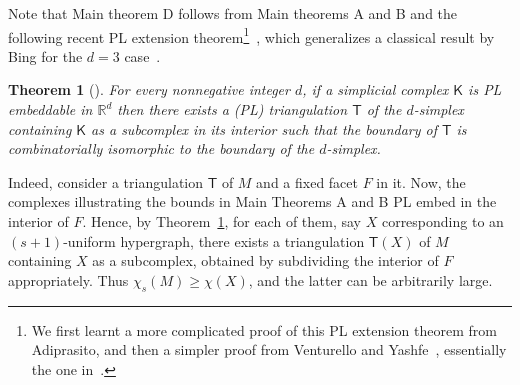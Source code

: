 \documentclass{article}
\newcommand{\RR}{\mathbb{R}}
\newcommand{\sK}{\mathsf{K}}
\newtheorem{thm}{Theorem}[section]
\theoremstyle{definition}
\begin{document}
Note that Main theorem D follows from Main theorems A and B and the following recent PL extension theorem\footnote{We first learnt a more complicated proof of this PL extension theorem from Adiprasito, and then a simpler proof from Venturello and Yashfe~\cite{PL-extension-karim-geva}, essentially the one in~\cite{adiprasito-patakova2024higherdimensionalversionfarystheorem}.}~\cite{adiprasito-patakova2024higherdimensionalversionfarystheorem}, which generalizes a classical result by Bing for the $d=3$ case~\cite[Theorem I.2.A]{Bing_geometric-topology-3-manifolds}.
\begin{thm}[\cite{adiprasito-patakova2024higherdimensionalversionfarystheorem, PL-extension-karim-geva}] \label{theorem_PL_extension_karim-geva}
For every nonnegative integer $d$, if a simplicial complex $\sK$ is PL embeddable in 
$\RR^d$
then there exists a (PL) triangulation $\mathsf{T}$
of the $d$-simplex containing $\sK$ as a subcomplex in its interior
such that the boundary of $\mathsf{T}$ is combinatorially isomorphic to the boundary of the 
$d$-simplex.
\end{thm}
Indeed, consider a triangulation $\mathsf{T}$ of $M$ and a fixed facet $F$ in it. Now, the complexes illustrating the bounds in Main Theorems A and B PL embed in the interior of $F$. Hence, by Theorem~\ref{theorem_PL_extension_karim-geva}, for each of them, say $X$ corresponding to an $(s+1)$-uniform hypergraph, there exists a triangulation $\mathsf{T}(X)$ of $M$ containing $X$ as a subcomplex, obtained by subdividing the interior of $F$ appropriately.
Thus $\chi_s(M)\ge \chi(X)$, and the latter can be arbitrarily large.

\medskip 
\end{document}
